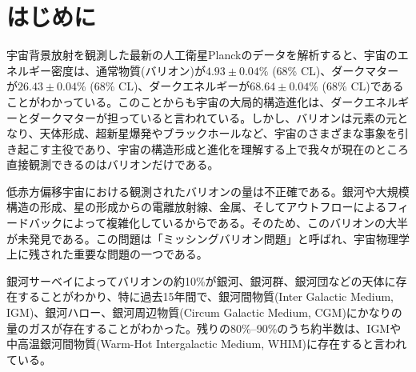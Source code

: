 \chapter{はじめに}

宇宙背景放射を観測した最新の人工衛星Planckのデータを解析すると、宇宙のエネルギー密度は、通常物質(バリオン)が$4.93\pm0.04\%$ (68\% CL)、ダークマターが$26.43\pm0.04$\% (68\% CL)、ダークエネルギーが$68.64\pm0.04$\% (68\% CL)であることがわかっている\citep{aghanim_planck_2020}。このことからも宇宙の大局的構造進化は、ダークエネルギーとダークマターが担っていると言われている。しかし、バリオンは元素の元となり、天体形成、超新星爆発やブラックホールなど、宇宙のさまざまな事象を引き起こす主役であり、宇宙の構造形成と進化を理解する上で我々が現在のところ直接観測できるのはバリオンだけである。

低赤方偏移宇宙における観測されたバリオンの量は不正確である。銀河や大規模構造の形成、星の形成からの電離放射線、金属、そしてアウトフローによるフィードバックによって複雑化しているからである\citep{shull_baryon_2012}。そのため、このバリオンの大半が未発見である。この問題は「ミッシングバリオン問題」と呼ばれ、宇宙物理学上に残された重要な問題の一つである。

銀河サーベイによってバリオンの約10\%が銀河、銀河群、銀河団などの天体に存在することがわかり、特に過去15年間で、銀河間物質(Inter Galactic Medium, IGM)、銀河ハロー、銀河周辺物質(Circum Galactic Medium, CGM)にかなりの量のガスが存在することがわかった。残りの80\%--90\%のうち約半数は、IGMや中高温銀河間物質(Warm-Hot Intergalactic Medium, WHIM)に存在すると言われている\citep{shull_baryon_2012,danforth_low-z_2008}。




